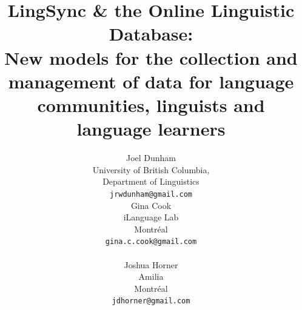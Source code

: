 \documentclass[11pt]{article}
\title{LingSync \& the Online Linguistic Database:\\New models for the
    collection and management of data for language communities, linguists and
language learners}
\author{Joel Dunham \\
University of British Columbia,   \\
Department of Linguistics \\
{\tt jrwdunham@gmail.com} \\\And
Gina Cook \\
iLanguage Lab \\
Montr\'eal \\
{\tt gina.c.cook@gmail.com} \\  \\\And
Joshua Horner \\
Amilia  \\
Montr\'eal \\
{\tt jdhorner@gmail.com} \\ }
\date{}
\begin{document}
\maketitle

\end{document}
